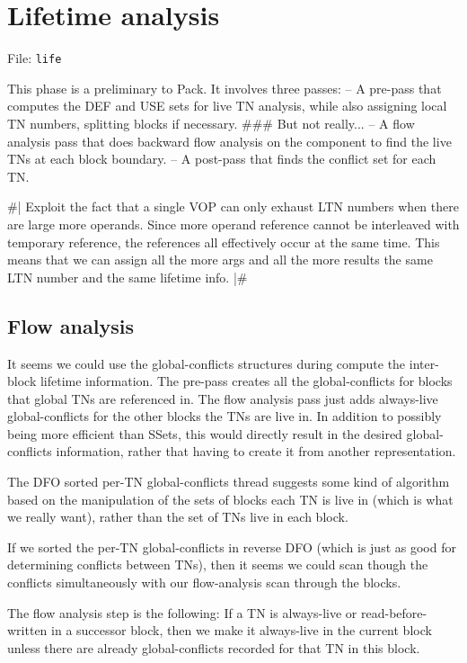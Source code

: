 
\chapter{Lifetime analysis}

File: {\tt life}

This phase is a preliminary to Pack.  It involves three passes:
 -- A pre-pass that computes the DEF and USE sets for live TN analysis, while
    also assigning local TN numbers, splitting blocks if necessary.  \#\#\# But
not really...
 -- A flow analysis pass that does backward flow analysis on the
    component to find the live TNs at each block boundary.
 -- A post-pass that finds the conflict set for each TN.

\#|
Exploit the fact that a single VOP can only exhaust LTN numbers when there are
large more operands.  Since more operand reference cannot be interleaved with
temporary reference, the references all effectively occur at the same time.
This means that we can assign all the more args and all the more results the
same LTN number and the same lifetime info.
|\#


\section{Flow analysis}

It seems we could use the global-conflicts structures during compute the
inter-block lifetime information.  The pre-pass creates all the
global-conflicts for blocks that global TNs are referenced in.  The flow
analysis pass just adds always-live global-conflicts for the other blocks the
TNs are live in.  In addition to possibly being more efficient than SSets, this
would directly result in the desired global-conflicts information, rather that
having to create it from another representation.

The DFO sorted per-TN global-conflicts thread suggests some kind of algorithm
based on the manipulation of the sets of blocks each TN is live in (which is
what we really want), rather than the set of TNs live in each block.

If we sorted the per-TN global-conflicts in reverse DFO (which is just as good
for determining conflicts between TNs), then it seems we could scan though the
conflicts simultaneously with our flow-analysis scan through the blocks.

The flow analysis step is the following:
    If a TN is always-live or read-before-written in a successor block, then we
    make it always-live in the current block unless there are already
    global-conflicts recorded for that TN in this block.

